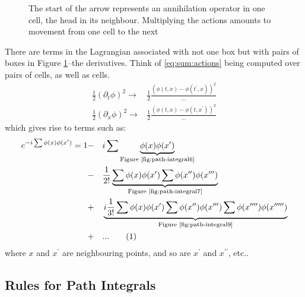 \documentclass[]{article}
\newcommand\numberthis{\addtocounter{equation}{1}\tag{\theequation}}
\begin{document}
\begin{figure}[H]
	\begin{center}
		\caption[Particle moving]{The start of the arrow represents an annihilation operator in one cell, the head in its neighbour. Multiplying the actions amounts to movement from one cell to the next}\label{fig:path-integral3}
	\end{center}
\end{figure}
 
There are terms in the Lagrangian associated with not one box but with pairs of boxes in Figure \ref{fig:path-integral3}--the derivatives. Think of \eqref{eq:sum:actions} being computed over pairs of cells, as well as cells.
\begin{align*}
	\frac{1}{2}(\partial_t \phi)^2 \rightarrow& \frac{1}{2}\frac{(\phi(t,x)-\phi(t^\prime,x))^2}{...}\\
	\frac{1}{2}(\partial_x \phi)^2 \rightarrow& \frac{1}{2}\frac{(\phi(t,x)-\phi(t,x^\prime))^2}{...} 
\end{align*}
which gives rise to terms such as:
\begin{alignat*}{2}
	e^{- i \sum \phi(x) \phi(x^\prime)}=1& -&& i \sum \underbrace{\phi(x) \phi(x^\prime)}_\text{Figure \ref{fig:path-integral6}}\\
	&-&& \frac{1}{2!}\underbrace{\sum \phi(x) \phi(x^\prime)\sum \phi(x^{\prime\prime}) \phi(x^{\prime\prime\prime})}_\text{Figure \ref{fig:path-integral7}}\\
	&+&&\underbrace{i\frac{1}{3!}\sum\phi(x)\phi(x^\prime)\sum\phi(x^{\prime\prime}) \phi(x^{\prime\prime\prime})\sum\phi(x^{\prime\prime\prime\prime}) \phi(x^{\prime\prime\prime\prime\prime})}_\text{Figure \ref{fig:path-integral9}}\\
	&+&& ... \numberthis \label{eq:path:integral:expanded}
\end{alignat*}
where $x$ and $x^{\prime}$ are neighbouring points, and so are $x^{\prime}$ and $x^{\prime\prime}$, etc..

\subsection{Rules for Path Integrals}
\end{document}
